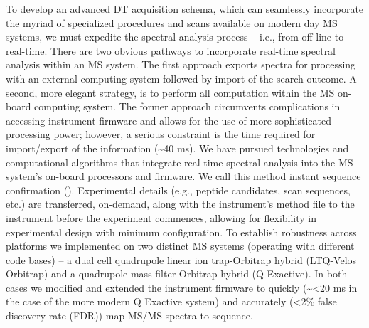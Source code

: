 To develop an advanced DT acquisition schema, which can seamlessly incorporate the myriad of specialized procedures and scans available on modern day MS systems, we must expedite the spectral analysis process -- i.e., from off-line to real-time. There are two obvious pathways to incorporate real-time spectral analysis within an MS system. The first approach exports spectra for processing with an external computing system followed by import of the search outcome.\cite{mqrt} A second, more elegant strategy, is to perform all computation within the MS on-board computing system.\cite{transform} The former approach circumvents complications in accessing instrument firmware and allows for the use of more sophisticated processing power; however, a serious constraint is the time required for import/export of the information (\textasciitilde40 ms). We have pursued technologies and computational algorithms that integrate real-time spectral analysis into the MS system's on-board processors and firmware. We call this method instant sequence confirmation (\inseq{}). Experimental details (e.g., peptide candidates, scan sequences, etc.) are transferred, on-demand, along with the instrument's method file to the instrument before the experiment commences, allowing for flexibility in experimental design with minimum configuration. To establish robustness across platforms we implemented \inseq{} on two distinct MS systems (operating with different code bases) -- a dual cell quadrupole linear ion trap-Orbitrap hybrid (LTQ-Velos Orbitrap) and a quadrupole mass filter-Orbitrap hybrid (Q Exactive). In both cases we modified and extended the instrument firmware to quickly (\textasciitilde<20 ms in the case of the more modern Q Exactive system) and accurately (<2\% false discovery rate (FDR)) map MS/MS spectra to sequence.
